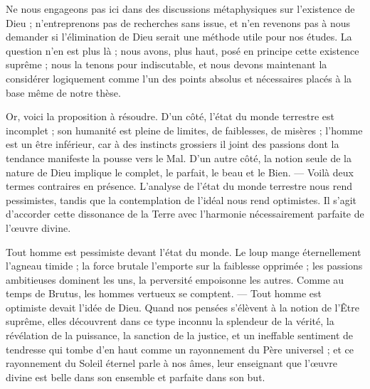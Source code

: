 \documentclass[a4paper, 11pt, oneside, landscape]{article}
\begin{document}
Ne nous engageons pas ici dans des discussions métaphysiques sur l'existence de Dieu ; n'entreprenons pas de recherches sans issue, et n'en revenons pas à nous demander si l'élimination de Dieu serait une méthode utile pour nos études. La question n'en est plus là ; nous avons, plus haut, posé en principe cette existence suprême ; nous la tenons pour indiscutable, et nous devons maintenant la considérer logiquement comme l'un des points absolus et nécessaires placés à la base même de notre thèse.

Or, voici la proposition à résoudre. D'un côté, l'état du monde terrestre est incomplet ; son humanité est pleine de limites, de faiblesses, de misères ; l'homme est un être inférieur, car à des instincts grossiers il joint des passions dont la tendance manifeste la pousse vers le Mal. D'un autre côté, la notion seule de la nature de Dieu implique le complet, le parfait, le beau et le Bien. --- Voilà deux termes contraires en présence. L'analyse de l'état du monde terrestre nous rend pessimistes, tandis que la contemplation de l'idéal nous rend optimistes. Il s'agit d'accorder cette dissonance de la Terre avec l'harmonie nécessairement parfaite de l'œuvre divine.

Tout homme est pessimiste devant l'état du monde. Le loup mange éternellement l'agneau timide ; la force brutale l'emporte sur la faiblesse opprimée ; les passions ambitieuses dominent les uns, la perversité empoisonne les autres. Comme au temps de Brutus, les hommes vertueux se comptent. --- Tout homme est optimiste devait l'idée de Dieu. Quand nos pensées s'élèvent à la notion de l'Être suprême, elles découvrent dans ce type inconnu la splendeur de la vérité, la révélation de la puissance, la sanction de la justice, et un ineffable sentiment de tendresse qui tombe d'en haut comme un rayonnement du Père universel ; et ce rayonnement du Soleil éternel parle à nos âmes, leur enseignant que l'œuvre divine est belle dans son ensemble et parfaite dans son but.
\end{document}
